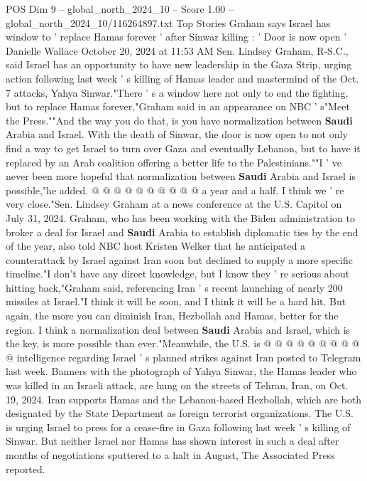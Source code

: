 \begin{textsample}{POS Dim 9 – global\_north\_2024\_10 – Score 1.00 – global\_north\_2024\_10/116264897.txt}  \label{ex:f9_pos_403}
Top Stories Graham says Israel has window to ' replace Hamas forever ' after Sinwar killing : ' Door is now open ' Danielle Wallace October 20, 2024 at 11:53 AM Sen.
Lindsey Graham, R-S.C., said Israel has an opportunity to have new leadership in the Gaza Strip, urging action following last week ' s killing of Hamas leader and mastermind of the Oct. 7 attacks, Yahya Sinwar."There ' s a window here not only to end the fighting, but to replace Hamas forever,"Graham said in an appearance on NBC ' s"Meet the Press.""And the way you do that, is you have normalization between \textbf{Saudi} Arabia and Israel.
With the death of Sinwar, the door is now open to not only find a way to get Israel to turn over Gaza and eventually Lebanon, but to have it replaced by an Arab coalition offering a better life to the Palestinians.""I ' ve never been more hopeful that normalization between \textbf{Saudi} Arabia and Israel is possible,"he added. @ @ @ @ @ @ @ @ @ @ a year and a half.
I think we ' re very close."Sen.
Lindsey Graham at a news conference at the U.S.
Capitol on July 31, 2024.
Graham, who has been working with the Biden administration to broker a deal for Israel and \textbf{Saudi} Arabia to establish diplomatic ties by the end of the year, also told NBC host Kristen Welker that he anticipated a counterattack by Israel against Iran soon but declined to supply a more specific timeline."I don't have any direct knowledge, but I know they ' re serious about hitting back,"Graham said, referencing Iran ' s recent launching of nearly 200 missiles at Israel."I think it will be soon, and I think it will be a hard hit.
But again, the more you can diminish Iran, Hezbollah and Hamas, better for the region.
I think a normalization deal between \textbf{Saudi} Arabia and Israel, which is the key, is more possible than ever."Meanwhile, the U.S. is @ @ @ @ @ @ @ @ @ @ intelligence regarding Israel ' s planned strikes against Iran posted to Telegram last week.
Banners with the photograph of Yahya Sinwar, the Hamas leader who was killed in an Israeli attack, are hung on the streets of Tehran, Iran, on Oct. 19, 2024.
Iran supports Hamas and the Lebanon-based Hezbollah, which are both designated by the State Department as foreign terrorist organizations.
The U.S. is urging Israel to press for a cease-fire in Gaza following last week ' s killing of Sinwar.
But neither Israel nor Hamas has shown interest in such a deal after months of negotiations sputtered to a halt in August, The Associated Press reported.

\end{textsample}
